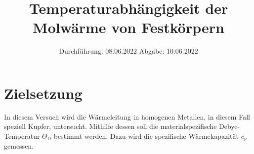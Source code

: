 

\subject{V47}
\title{Temperaturabhängigkeit der Molwärme von Festkörpern}
\date{
    Durchführung: 08.06.2022
     \hspace{3em}
    Abgabe: 10.06.2022
}


\maketitle
\thispagestyle{empty}
\tableofcontents
\newpage

\section{Zielsetzung}

    In diesem Versuch wird die Wärmeleitung in homogenen Metallen,
    in diesem Fall speziell Kupfer,
    untersucht.
    Mithilfe dessen soll die materialspezifische Debye-Temperatur $\Theta_\text{D}$ bestimmt werden.
    Dazu wird die spezifische Wärmekapazität $c_p$ gemessen.


\clearpage


\clearpage


\clearpage


\clearpage

\printbibliography


